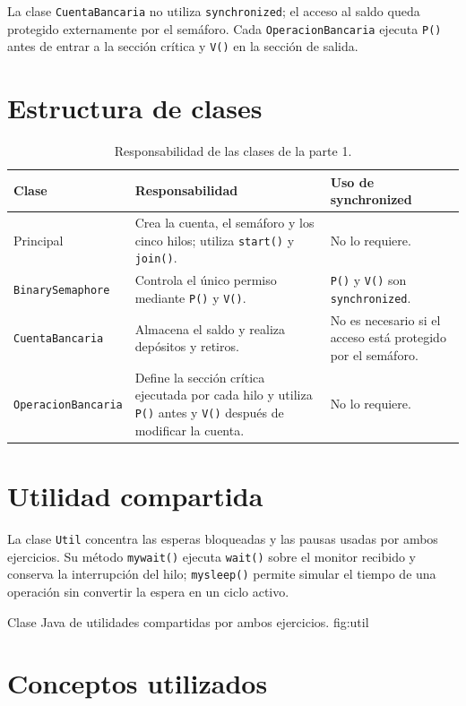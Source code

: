 \documentclass[12pt,oneside]{template/liverpoolthesis}
\begin{document}
La clase \texttt{CuentaBancaria} no utiliza \texttt{synchronized}; el acceso
al saldo queda protegido externamente por el semáforo. Cada
\texttt{OperacionBancaria} ejecuta \texttt{P()} antes de entrar a la sección
crítica y \texttt{V()} en la sección de salida.

\section{Estructura de clases}

\begin{table}[H]
\centering
\caption{Responsabilidad de las clases de la parte 1.}
\label{tab:clases-binario}
\begin{tabularx}{\textwidth}{P{3.7cm} L P{2.6cm}}
\toprule
\textbf{Clase} & \textbf{Responsabilidad} & \textbf{Uso de synchronized}\\
\midrule
Principal & Crea la cuenta, el semáforo y los cinco hilos; utiliza
\texttt{start()} y \texttt{join()}. & No lo requiere.\\
\texttt{BinarySemaphore} & Controla el único permiso mediante
\texttt{P()} y \texttt{V()}. & \texttt{P()} y \texttt{V()} son
\texttt{synchronized}.\\
\texttt{CuentaBancaria} & Almacena el saldo y realiza depósitos y retiros. &
No es necesario si el acceso está protegido por el semáforo.\\
\texttt{OperacionBancaria} & Define la sección crítica ejecutada por cada
hilo y utiliza \texttt{P()} antes y \texttt{V()} después de modificar la
cuenta. & No lo requiere.\\
\bottomrule
\end{tabularx}
\end{table}

\section{Utilidad compartida}

La clase \texttt{Util} concentra las esperas bloqueadas y las pausas usadas
por ambos ejercicios. Su método \texttt{mywait()} ejecuta \texttt{wait()} sobre
el monitor recibido y conserva la interrupción del hilo; \texttt{mysleep()}
permite simular el tiempo de una operación sin convertir la espera en un ciclo
activo.

  {Clase Java de utilidades compartidas por ambos ejercicios.}
  {fig:util}

\section{Conceptos utilizados}
\end{document}
